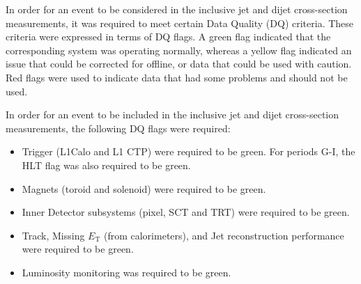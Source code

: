 %
%
%
% 


In order for an event to be considered in the inclusive jet and dijet cross-section measurements, it was required to meet certain Data Quality (DQ) criteria. These criteria were expressed in terms of DQ flags. A green flag indicated that the corresponding system was operating normally, whereas a yellow flag indicated an issue that could be corrected for offline, or data that could be used with caution. Red flags were used to indicate data that had some problems and should not be used.

In order for an event to be included in the inclusive jet and dijet cross-section measurements, the following DQ flags were required:
\begin{itemize}
\item Trigger (L1Calo and L1 CTP) were required to be green. For periods G-I, the HLT flag was also required to be green.
\item Magnets (toroid and solenoid) were required to be green.
\item Inner Detector subsystems (pixel, SCT and TRT) were required to be green.
\item Track, Missing $E_\mathrm{T}$ (from calorimeters), and Jet reconstruction performance were required to be green.
\item Luminosity monitoring was required to be green.
\end{itemize}



